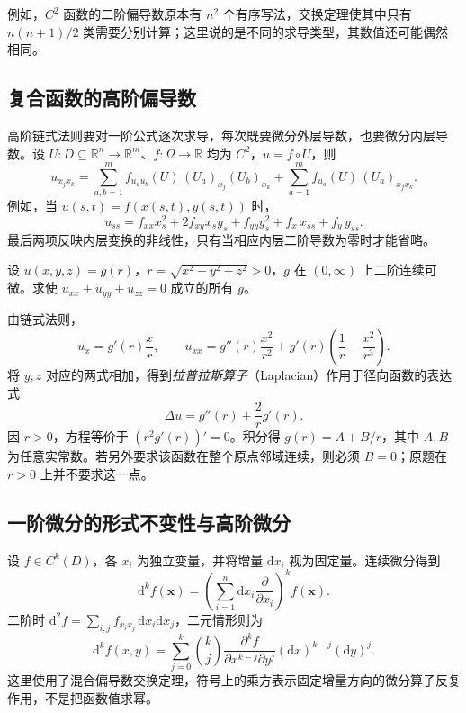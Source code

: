\documentclass[UTF8,12pt,a4paper,fontset=fandol]{ctexbook}
\begin{document}
例如，$C^2$ 函数的二阶偏导数原本有 $n^2$ 个有序写法，交换定理使其中只有 $n(n+1)/2$ 类需要分别计算；这里说的是不同的求导类型，其数值还可能偶然相同。

\subsection{复合函数的高阶偏导数}
\label{subsec:higher-partial-derivatives-of-composite-functions}

高阶链式法则要对一阶公式逐次求导，每次既要微分外层导数，也要微分内层导数。设 $U:D\subseteq\mathbb R^n\to\mathbb R^m$、$f:\Omega\to\mathbb R$ 均为 $C^2$，$u=f\circ U$，则
\begin{equation}
\label{eq:second-order-chain-rule-ch14}
    u_{x_jx_k}
    =\sum_{a,b=1}^m f_{u_au_b}(U)\,(U_a)_{x_j}(U_b)_{x_k}
      +\sum_{a=1}^m f_{u_a}(U)\,(U_a)_{x_jx_k}.
\end{equation}
例如，当 $u(s,t)=f(x(s,t),y(s,t))$ 时，
\[
    u_{ss}=f_{xx}x_s^2+2f_{xy}x_sy_s+f_{yy}y_s^2
        +f_x\,x_{ss}+f_y\,y_{ss}.
\]
最后两项反映内层变换的非线性，只有当相应内层二阶导数为零时才能省略。

\begin{example}
\label{ex:radial-harmonic-function-ch14}
设 $u(x,y,z)=g(r)$，$r=\sqrt{x^2+y^2+z^2}>0$，$g$ 在 $(0,\infty)$ 上二阶连续可微。求使 $u_{xx}+u_{yy}+u_{zz}=0$ 成立的所有 $g$。
\end{example}
\begin{solve}
由链式法则，
\[
    u_x=g'(r)\frac{x}{r},\qquad
    u_{xx}=g''(r)\frac{x^2}{r^2}
        +g'(r)\left(\frac1r-\frac{x^2}{r^3}\right).
\]
将 $y,z$ 对应的两式相加，得到\emph{拉普拉斯算子}（Laplacian）作用于径向函数的表达式
\[
    \Delta u=g''(r)+\frac2r g'(r).
\]
因 $r>0$，方程等价于 $(r^2g'(r))'=0$。积分得 $g(r)=A+B/r$，其中 $A,B$ 为任意实常数。若另外要求该函数在整个原点邻域连续，则必须 $B=0$；原题在 $r>0$ 上并不要求这一点。
\end{solve}

\subsection{一阶微分的形式不变性与高阶微分}
\label{subsec:invariance-and-higher-multivariable-differentials}

设 $f\in C^k(D)$，各 $x_i$ 为独立变量，并将增量 $\mathrm dx_i$ 视为固定量。连续微分得到
\begin{equation}
\label{eq:higher-total-differentials-ch14}
    \mathrm d^k f(\boldsymbol x)
    =\left(\sum_{i=1}^n\mathrm dx_i\frac{\partial}{\partial x_i}\right)^k
       f(\boldsymbol x).
\end{equation}
二阶时 $\mathrm d^2f=\sum_{i,j}f_{x_ix_j}\,\mathrm dx_i\mathrm dx_j$，二元情形则为
\[
    \mathrm d^kf(x,y)=\sum_{j=0}^k\binom kj
       \frac{\partial^kf}{\partial x^{k-j}\partial y^j}
       (\mathrm dx)^{k-j}(\mathrm dy)^j.
\]
这里使用了混合偏导数交换定理，符号上的乘方表示固定增量方向的微分算子反复作用，不是把函数值求幂。
\end{document}

